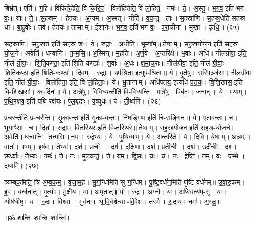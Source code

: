 बिभ्र॑त्। एति॑। ग॒हि॒॥ 
विकि॑रि॒देति॒ वि-कि॒रि॒द॒। विलो॑हि॒तेति॒ वि-लो॒हि॒त॒। नमः॑। ते॒। अ॒स्तु॒। भ॒ग॒व॒ इति॑ भग-वः॒॥ 
याः। ते॒। स॒हस्रम्। हे॒तयः॑। अ॒न्यम्। अ॒स्मत्। नीति॑। व॒प॒न्तु॒। ताः॥ 
स॒हस्रा॑णि। स॒ह॒स्र॒धेति॑ सहस्र-धा। बा॒हु॒वोः। तव॑। हे॒तयः॑॥ 
तासाम्। ईशा॑नः। भ॒ग॒व॒ इति॑ भग-वः॒। प॒रा॒चीना। मुखा। कृ॒धि॒॥ (२५)


स॒हस्रा॑णि। स॒ह॒स्र॒श इति॑ सहस्र-शः। ये। रु॒द्राः। अधीति॑। भूम्या᳚म्॥ 
तेषाम्। स॒ह॒स्र॒यो॒ज॒न इति॑ सहस्र-यो॒ज॒ने। अवेति॑। धन्वा॑नि। त॒न्म॒सि॒॥ 
अ॒स्मिन्। म॒ह॒ति। अ॒र्ण॒वे। अ॒न्तरि॑क्षे। भ॒वाः। अधि॑॥ 
नील॑ग्रीवा॒ इति॒ नील॑-ग्री॒वाः॒। शि॒ति॒कण्ठा॒ इति॑ शिति-कण्ठाः᳚। श॒र्वाः। अ॒धः। क्ष॒मा॒च॒राः॥ 
नील॑ग्रीवा॒ इति॒ नील॑-ग्री॒वाः॒। शि॒ति॒कण्ठा॒ इति॑ शिति-कण्ठाः᳚। दिवम्। रु॒द्राः। उप॑श्रिता॒ इत्युप॑-श्रि॒ताः॒॥ 
ये। वृ॒क्षेषु॑। स॒स्पिञ्ज॑राः। नील॑ग्रीवा॒ इति॒ नील॑-ग्री॒वाः॒। विलो॑हिता॒ इति॒ वि-लो॒हि॒ताः॒॥ 
ये। भू॒तानाम्। अधि॑पतय॒ इत्यधि॑-प॒त॒यः॒। वि॒शि॒खास॒ इति॑ वि-शि॒खासः॑। क॒प॒र्दिनः॑॥ 
ये। अन्ने॑षु। वि॒विध्य॒न्तीति॑ वि-विध्य॑न्ति। पात्रे॑षु। पिब॑तः। जनान्॥ 
ये। प॒थाम्। प॒थि॒रक्ष॑य॒ इति॑ पथि-रक्ष॑यः। ऐ॒ल॒बृ॒दाः। य॒व्युधः॑॥ 
ये। ती॒र्थानि॑। (२६)


प्र॒चर॒न्तीति॑ प्र-चर॑न्ति। सृ॒काव॑न्त॒ इति॑ सृ॒का-व॒न्तः॒। नि॒ष॒ङ्गिण॒ इति॑ नि-स॒ङ्गिनः॑॥ 
ये। ए॒ताव॑न्तः। च॒। भूयाꣳ॑सः। च॒। दिशः॑। रु॒द्राः। वि॒त॒स्थिर॒ इति॑ वि-त॒स्थि॒रे॥ 
तेषाम्। स॒ह॒स्र॒यो॒ज॒न इति॑ सहस्र-यो॒ज॒ने। अवेति॑। धन्वा॑नि। त॒न्म॒सि॒॥ 
नमः॑। रु॒द्रेभ्यः॑। ये। पृ॒थि॒व्याम्। ये। अ॒न्तरि॑क्षे। ये। दि॒वि। येषाम्। अन्नम्। वातः॑। व॒\ar{}षम्।
 इष॑वः। तेभ्यः॑। दश॑। प्राची। दश॑। द॒क्षि॒णा। दश॑। प्र॒तीची। दश॑। उदी॑चीः। दश॑। ऊ॒र्ध्वाः।
  तेभ्यः॑। नमः॑। ते। नः॒। मृ॒ड॒य॒न्तु॒। ते। यम्। द्वि॒ष्मः। यः। च॒। नः॒। द्वेष्टि॑। तम्। वः॒। जम्भे। द॒धा॒मि॒॥ (२७)

त्र्य॑म्बक॒मिति॒ त्रि-अ॒म्ब॒क॒म्॒। य॒जा॒म॒हे॒। सु॒ग॒न्धिमिति॑ सु-ग॒न्धिम्। पु॒ष्टि॒वर्ध॑न॒मिति॑ पुष्टि-वर्ध॑नम्॥ 
उ॒र्वा॒रु॒कम्। इ॒व॒। बन्ध॑नात्। मृ॒त्योः। मु॒क्षी॒य॒। मा। अ॒मृता᳚त्॥ 
यो। रु॒द्रः। अ॒ग्नौ। यः। अ॒प्स्वित्य॑प्-सु। यः। ओष॑धीषु। यः। रु॒द्रः। विश्वा। भुव॑ना। आ॒वि॒वेशेत्या-वि॒वेश॑। तस्मै। रु॒द्राय॑। नमः॑। अ॒स्तु॒॥

\centerline{॥ॐ शान्तिः॒ शान्तिः॒ शान्तिः॑॥}


